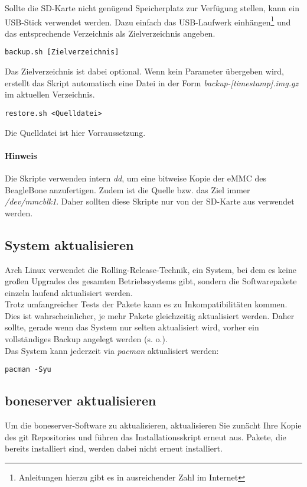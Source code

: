 \documentclass[manual.tex]{subfiles}
\begin{document}
Sollte die SD-Karte nicht genügend Speicherplatz zur Verfügung stellen, kann ein USB-Stick verwendet werden. Dazu einfach das USB-Laufwerk einhängen\footnote{Anleitungen hierzu gibt es in ausreichender Zahl im Internet} und das entsprechende Verzeichnis als Zielverzeichnis angeben.

\begin{lstlisting}
backup.sh [Zielverzeichnis]
\end{lstlisting}

Das Zielverzeichnis ist dabei optional. Wenn kein Parameter übergeben wird, erstellt das Skript automatisch eine Datei in der Form \textit{backup-[timestamp].img.gz} im aktuellen Verzeichnis.

\begin{lstlisting}
restore.sh <Quelldatei>
\end{lstlisting}

Die Quelldatei ist hier Vorraussetzung.

\paragraph{Hinweis} Die Skripte verwenden intern \emph{dd}, um eine bitweise Kopie der eMMC des BeagleBone anzufertigen. Zudem ist die Quelle bzw. das Ziel immer \textit{/dev/mmcblk1}. Daher sollten diese Skripte nur von der SD-Karte aus verwendet werden.


\subsection{System aktualisieren}
Arch Linux verwendet die Rolling-Release-Technik, ein System, bei dem es keine großen Upgrades des gesamten Betriebssystems gibt, sondern die Softwarepakete einzeln laufend aktualisiert werden.\\
Trotz umfangreicher Tests der Pakete kann es zu Inkompatibilitäten kommen. Dies ist wahrscheinlicher, je mehr Pakete gleichzeitig aktualisiert werden. Daher sollte, gerade wenn das System nur selten aktualisiert wird, vorher ein vollständiges Backup angelegt werden (s. o.).\\

Das System kann jederzeit via \emph{pacman} aktualisiert werden:

\begin{lstlisting}
pacman -Syu
\end{lstlisting}


\subsection{boneserver aktualisieren}
Um die boneserver-Software zu aktualisieren, aktualisieren Sie zunächt Ihre Kopie des git Repositories und führen das Installationsskript erneut aus. Pakete, die bereits installiert sind, werden dabei nicht erneut installiert.
\end{document}
